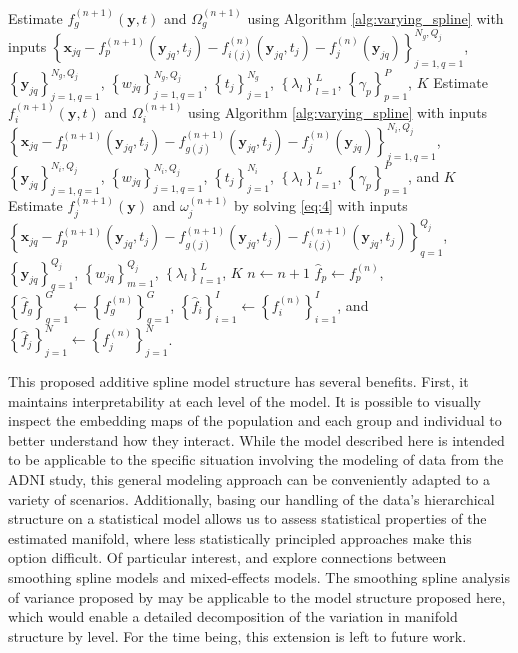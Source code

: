 \documentclass[11pt,reqno]{article}
\theoremstyle{definition}
\begin{document}
\begin{algorithm}
{{      Estimate $f_{g}^{(n+1)}(\mathbf{y}, t)$ and $\Omega_{g}^{(n+1)}$ using Algorithm \ref{alg:varying_spline} with inputs $\left\{\mathbf{x}_{jq} - f_{p}^{(n+1)}(\mathbf{y}_{jq}, t_j) - f_{i(j)}^{(n)}(\mathbf{y}_{jq}, t_j) - f_{j}^{(n)}(\mathbf{y}_{jq})\right\}_{j=1, q=1}^{N_g, Q_j}$, $\left\{\mathbf{y}_{jq}\right\}_{j=1, q=1}^{N_g, Q_j}$, $\left\{w_{jq}\right\}_{j=1, q=1}^{N_g, Q_j}$, $\left\{t_j\right\}_{j=1}^{N_g}$, $\left\{\lambda_l\right\}_{l=1}^{L}$, $\left\{\gamma_p\right\}_{p=1}^{P}$, $K$\;
    }
     {
      Estimate $f_{i}^{(n+1)}(\mathbf{y}, t)$ and $\Omega_{i}^{(n+1)}$ using Algorithm \ref{alg:varying_spline} with inputs $\left\{\mathbf{x}_{jq} - f_{p}^{(n+1)}(\mathbf{y}_{jq}, t_j) - f_{g(j)}^{(n+1)}(\mathbf{y}_{jq}, t_j) - f_j^{(n)}(\mathbf{y}_{jq})\right\}_{j=1, q=1}^{N_i, Q_j}$, $\left\{\mathbf{y}_{jq}\right\}_{j=1, q=1}^{N_i, Q_j}$, $\left\{w_{jq}\right\}_{j=1, q=1}^{N_i, Q_j}$, $\left\{t_j\right\}_{j=1}^{N_i}$, $\left\{\lambda_l\right\}_{l=1}^{L}$, $\left\{\gamma_p\right\}_{p=1}^{P}$, and $K$\;
    }
     {
      Estimate $f_{j}^{(n+1)}(\mathbf{y})$ and $\omega_{j}^{(n+1)}$ by solving \ref{eq:4} with inputs $\left\{\mathbf{x}_{jq} - f_{p}^{(n+1)}(\mathbf{y}_{jq}, t_j) - f_{g(j)}^{(n+1)}(\mathbf{y}_{jq}, t_j) - f_{i(j)}^{(n+1)}(\mathbf{y}_{jq}, t_j)\right\}_{q=1}^{Q_j}$, $\left\{\mathbf{y}_{jq}\right\}_{q=1}^{Q_j}$, $\left\{w_{jq}\right\}_{m = 1}^{Q_j}$, $\left\{\lambda_l\right\}_{l=1}^{L}$, $K$\;
    }
    $n \gets n + 1$\;
  }
  $\hat{f}_p \gets f_{p}^{(n)}$, $\left\{\hat{f}_g\right\}_{g = 1}^{G} \gets \left\{f_{g}^{(n)}\right\}_{g = 1}^{G}$, $\left\{\hat{f}_i\right\}_{i=1}^{I} \gets \left\{f_{i}^{(n)}\right\}_{i=1}^{I}$, and $\left\{\hat{f}_j\right\}_{j=1}^{N} \gets \left\{f_j^{(n)}\right\}_{j=1}^{N}$.
\end{algorithm}

This proposed additive spline model structure has several benefits. First, it maintains interpretability at each level of the model. It is possible to visually inspect the embedding maps of the population and each group and individual to better understand how they interact. While the model described here is intended to be applicable to the specific situation involving the modeling of data from the ADNI study, this general modeling approach can be conveniently adapted to a variety of scenarios. Additionally, basing our handling of the data's hierarchical structure on a statistical model allows us to assess statistical properties of the estimated manifold, where less statistically principled approaches make this option difficult. Of particular interest, \cite{wangMixedEffectsSmoothing1998} and \cite{brumbackSmoothingSplineModels1998} explore connections between smoothing spline models and mixed-effects models. The smoothing spline analysis of variance proposed by \cite{wangMixedEffectsSmoothing1998} may be applicable to the model structure proposed here, which would enable a detailed decomposition of the variation in manifold structure by level. For the time being, this extension is left to future work.
\end{document}
